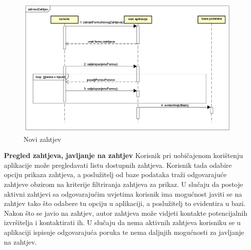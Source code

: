 				
				\begin{figure}[H]
					\includegraphics[scale=0.5]{slike/novi-zahtjev.png} %
					\centering
					\caption{Novi zahtjev}
				\end{figure}
				\newpage
				
				\noindent \large {\textbf{Pregled zahtjeva, javljanje na zahtjev}}
				\newline
				\noindent \normalsize Korisnik pri uobičajenom korištenju aplikacije može pregledavati listu dostupnih zahtjeva. Korisnik tada odabire opciju prikaza zahtjeva, a poslužitelj od baze podataka traži odgovarajuće zahtjeve obzirom na kriterije filtriranja zahtjeva za prikaz. U slučaju da postoje aktivni zahtjevi sa odgovarajućim uvjetima korisnik ima mogućnost javiti se na zahtjev tako što odabere tu opciju u aplikaciji, a poslužitelj to evidentira u bazi. Nakon što se javio na zahtjev, autor zahtjeva može vidjeti kontakte potencijalnih izvršitelja i kontaktirati ih. U slučaju da nema aktivnih zahtjeva korisniku se u aplikaciji ispisuje odgovarajuća poruka te nema daljnjih mogućnosti za javljanje na zahtjev. 
				   
